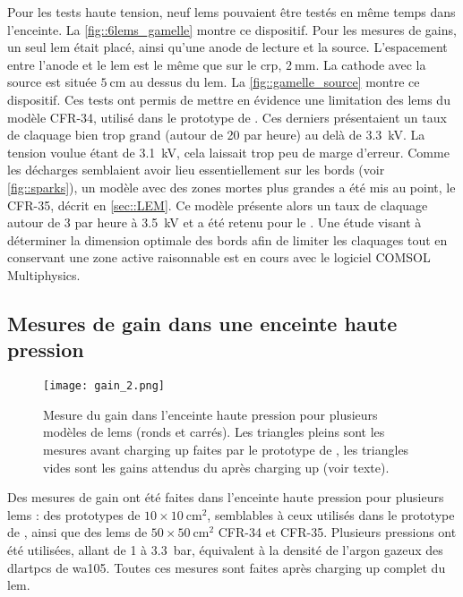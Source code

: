       Pour les tests haute tension, neuf \glspl{lem} pouvaient être testés en même temps dans l'enceinte. La \autoref{fig::6lems_gamelle} montre  ce dispositif. Pour les mesures de gains, un seul \gls{lem} était placé, ainsi qu'une anode de lecture et la source. L'espacement entre l'anode et le \gls{lem} est le même que sur le \gls{crp}, $\SI{2}{\milli\meter}$. La cathode avec la source est située $\SI{5}{\centi\meter}$ au dessus du \gls{lem}. La \autoref{fig::gamelle_source} montre ce dispositif. Ces tests ont permis de mettre en évidence une limitation des \glspl{lem} du modèle CFR-34, utilisé dans le prototype de \TOO{}. Ces derniers présentaient un taux de claquage bien trop grand (autour de 20 par heure) au delà de \SI{3.3}{\kilo\volt}. La tension voulue étant de \SI{3.1}{\kilo\volt}, cela laissait trop peu de marge d'erreur. Comme les décharges semblaient avoir lieu essentiellement sur les bords (voir \autoref{fig::sparks}), un modèle avec des zones mortes plus grandes a été mis au point, le CFR-35, décrit en \autoref{sec::LEM}. Ce modèle présente alors un taux de claquage autour de 3 par heure à \SI{3.5}{\kilo\volt} et a été retenu pour le \SSS{}. Une étude visant à déterminer la dimension optimale des bords afin de limiter les claquages tout en conservant une zone active raisonnable est en cours avec le logiciel COMSOL Multiphysics.

    \subsection{Mesures de gain dans une enceinte haute pression}\label{sec::test_gain}

      \begin{figure}[!htb]
        \texttt{[image: gain\_2.png]}
        \caption[Mesure du gain dans l'enceinte haute pression]{\label{fig::gain_gamelle}Mesure du gain dans l'enceinte haute pression pour plusieurs modèles de \glspl{lem} (ronds et carrés). Les triangles pleins sont les mesures avant charging up faites par le prototype de \threeL{}\cite{Cantini2014}, les triangles vides sont les gains attendus du \threeL{} après charging up (voir texte).}
      \end{figure}

      Des mesures de gain ont été faites dans l'enceinte haute pression pour plusieurs \glspl{lem} : des prototypes de $10\times\SI{10}{\centi\meter\squared}$, semblables à ceux utilisés dans le prototype de \threeL{}, ainsi que des \glspl{lem} de $50\times\SI{50}{\centi\meter\squared}$ CFR-34 et CFR-35. Plusieurs pressions ont été utilisées, allant de 1 à \SI{3.3}{\bar}, équivalent à la densité de l'argon gazeux des \glspl{dlartpc} de \gls{wa105}. Toutes ces mesures sont faites après charging up complet du \gls{lem}.

